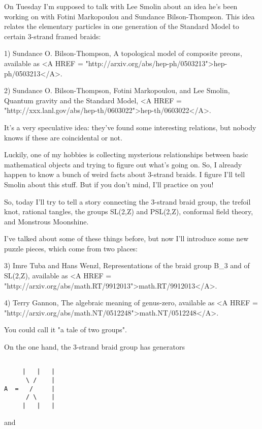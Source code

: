 

On Tuesday I'm supposed to talk with Lee Smolin about an idea he's
been working on with Fotini Markopoulou and Sundance Bilson-Thompson.
This idea relates the elementary particles in one generation of the 
Standard Model to certain 3-strand framed braids:

1) Sundance O. Bilson-Thompson, A topological model of composite
preons, available as <A HREF =
"http://arxiv.org/abs/hep-ph/0503213">hep-ph/0503213</A>.

2) Sundance O. Bilson-Thompson, Fotini Markopoulou, and Lee Smolin, 
Quantum gravity and the Standard Model, <A HREF = "http://xxx.lanl.gov/abs/hep-th/0603022">hep-th/0603022</A>.
 
It's a very speculative idea: they've found some interesting relations, 
but nobody knows if these are coincidental or not.  

Luckily, one of my hobbies is collecting mysterious relationships between
basic mathematical objects and trying to figure out what's going on.
So, I already happen to know a bunch of weird facts about 3-strand braids.  
I figure I'll tell Smolin about this stuff.  But if you don't mind, I'll 
practice on you!  

So, today I'll try to tell a story connecting the 3-strand braid group, 
the trefoil knot, rational tangles, the groups SL(2,Z) and PSL(2,Z), 
conformal field theory, and Monstrous Moonshine.  

I've talked about some of these things before, but now I'll introduce
some new puzzle pieces, which come from two places:

3) Imre Tuba and Hans Wenzl, Representations of the braid group B_{3}
and of SL(2,Z), available as <A HREF =
"http://arxiv.org/abs/math.RT/9912013">math.RT/9912013</A>.
 
4) Terry Gannon, The algebraic meaning of genus-zero, available as
<A HREF = "http://arxiv.org/abs/math.NT/0512248">math.NT/0512248</A>.

You could call it "a tale of two groups".

On the one hand, the 3-strand braid group has generators 


\begin{verbatim}

     |   |   |
      \ /    |
A  =   /     |
      / \    |
     |   |   |
\end{verbatim}
    
and


